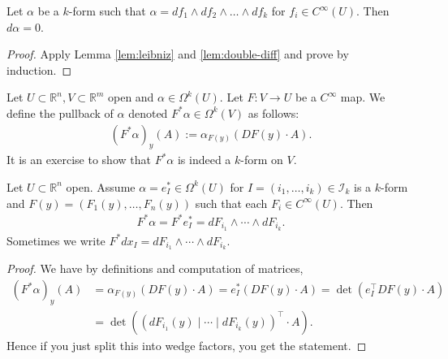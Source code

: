 \begin{corollary}\label{diff-exact-forms}
	Let $\alpha$ be a $k$-form such that $\alpha = d f_{1} \wedge d f_{2} \wedge \dots \wedge  df_{k}$ for $f_{i} \in C^{\infty}(U)$. Then $d\alpha = 0$.
\end{corollary}
\begin{proof}
	Apply Lemma \ref{lem:leibniz} and \ref{lem:double-diff} and prove by induction.
\end{proof}

\begin{definition}[Pullback]\label{def:pullback}
	Let $U \subset \mathbb{R}^{n}, V \subset \mathbb{R}^{m}$ open and $\alpha \in \Omega^{k}(U)$. Let $F: V \to U$ be a $C^{\infty}$ map. We define the pullback of $\alpha $ denoted $F^*\alpha \in \Omega^{k}(V)$ as follows:
	\begin{align*}
		(F^*\alpha)_{y}(A) := \alpha_{F(y)}(DF(y) \cdot A).
	\end{align*}
	It is an exercise to show that $F^*\alpha $ is indeed a $k$-form on $V$.
\end{definition}

\begin{lemma}\label{lem:pullback-basis}
	Let $U \subset \mathbb{R}^{n}$ open. Assume $\alpha = e_{I}^* \in \Omega^{k}(U)$ for $I = (i_{1}, \dots, i_{k}) \in \mathcal{I}_{k}$ is a $k$-form and $F(y) = (F_{1}(y), \dots, F_{n}(y))$ such that each $F_{i} \in C^{\infty}(U)$. Then
	\begin{align*}
		F^*\alpha = F^*e_{I}^* = dF_{i_{1}} \wedge \cdots \wedge dF_{i_{k}}.
	\end{align*}
	Sometimes we write $F^*dx_{I} = dF_{i_{1}} \wedge \cdots \wedge dF_{i_{k}}$.
\end{lemma}
\begin{proof}
	We have by definitions and computation of matrices,
	\begin{align*}
		(F^*\alpha)_{y} (A) & = \alpha_{F(y)}(DF(y) \cdot A) = e_{I}^*(DF(y) \cdot A) = \det (e_{I}^\top DF(y) \cdot A) \\ &= \det \left( (dF_{i_{1}}(y) \mid \cdots \mid dF_{i_{k}}(y))^\top \cdot A\right).
	\end{align*}
	Hence if you just split this into wedge factors, you get the statement.
\end{proof}

